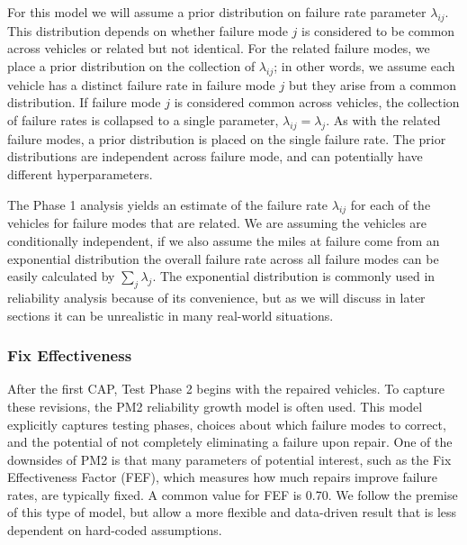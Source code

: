 \documentclass[12pt]{article}
\begin{document}
For this model we will assume a prior distribution on failure rate parameter
$\lambda_{ij}$.  This distribution depends on whether failure mode $j$ is
considered to be common across vehicles or related but not identical. For the
related failure modes, we place a prior distribution on the collection of
$\lambda_{ij}$; in other words, we assume each vehicle has a distinct failure
rate in failure mode $j$ but they arise from a common distribution.  If failure
mode $j$ is considered common across vehicles, the collection of failure rates
is collapsed to a single parameter, $\lambda_{ij} = \lambda_j$. As with the
related failure modes, a prior distribution is placed on the single failure
rate. The prior distributions are independent across failure mode, and can
potentially have different hyperparameters.

The Phase 1 analysis yields an estimate of the failure rate $\lambda_{ij}$ for
each of the vehicles for failure modes that are related.  We are assuming the
vehicles are conditionally independent, if we also assume the miles at failure
come from an exponential distribution the overall failure rate across all
failure modes can be easily calculated by $\sum_{j}\lambda_{j}$.  The
exponential distribution is commonly used in reliability analysis because of its
convenience, but as we will discuss in later sections it can be unrealistic in
many real-world situations.

\subsubsection{Fix Effectiveness}
After the first CAP, Test Phase 2 begins with the repaired vehicles. To capture
these revisions, the PM2 reliability growth model \cite{EH06} is often used.
This model explicitly captures testing phases, choices about which failure modes
to correct, and the potential of not completely eliminating a failure upon
repair. One of the downsides of PM2 is that many parameters of potential
interest, such as the Fix Effectiveness Factor (FEF), which measures how much
repairs improve failure rates, are typically fixed. A common value for FEF is
0.70. We follow the premise of this type of model, but allow a more flexible and
data-driven result that is less dependent on hard-coded assumptions.
\end{document}
